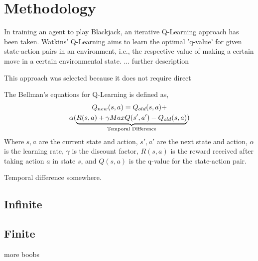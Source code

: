 \section{Methodology}

In training an agent to play Blackjack, an iterative Q-Learning approach has been taken. Watkins' Q-Learning aims to learn the optimal 'q-value' for given state-action pairs in an environment, i.e., the respective value of making a certain move in a certain environmental state. ... further description

This approach was selected because it does not require direct 

The Bellman's equations for Q-Learning is defined as,
\begin{multline}
    Q_{new}(s,a)=Q_{old}(s,a)+\\\alpha(\underbrace{R(s,a)+\gamma MaxQ(s',a')-Q_{old}(s,a)}_{\mathclap{\text{Temporal Difference}}})
\end{multline}
Where \( s, a \) are the current state and action,  \( s', a' \) are the next state and action, \( \alpha \) is the learning rate, \( \gamma \) is the discount factor, \( R(s,a) \) is the reward received after taking action \( a \) in state \( s \), and \( Q(s,a) \) is the q-value for the state-action pair. 

Temporal difference somewhere. 

\subsection{Infinite}



\subsection{Finite}
more boobs